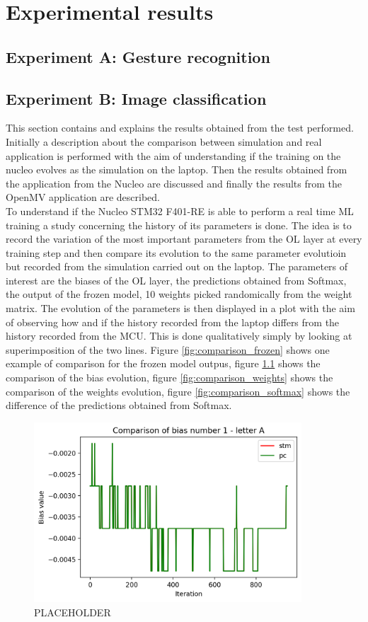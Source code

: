 \documentclass[12pt]{report}
\begin{document}
\chapter{Experimental results} 

\section{Experiment A: Gesture recognition}

\section{Experiment B: Image classification}

This section contains and explains the results obtained from the test performed. Initially a description about the comparison between simulation and real application is performed with the aim of understanding if the training on the nucleo evolves as the simulation on the laptop. Then the results obtained from the application from the Nucleo are discussed and finally the results from the OpenMV application are described.\\
To understand if the Nucleo STM32 F401-RE is able to perform a real time ML training a study concerning the history of its parameters is done. The idea is to record the variation of the most important parameters from the OL layer at every training step and then compare its evolution to the same parameter evolutioin but recorded from the simulation carried out on the laptop. The parameters of interest are the biases of the OL layer, the predictions obtained from Softmax, the output of the frozen model, 10 weights picked randomically from the weight matrix. The evolution of the parameters is then displayed in a plot with the aim of observing how and if the history recorded from the laptop differs from the history recorded from the MCU. This is done qualitatively simply by looking at superimposition of the two lines. Figure \ref{fig:comparison_frozen} shows one example of comparison for the frozen model outpus, figure \ref{fig:comparison_bias} shows the comparison of the bias evolution, figure \ref{fig:comparison_weights} shows the comparison of the weights evolution, figure \ref{fig:comparison_softmax} shows the difference of the predictions obtained from Softmax.
%
\begin{figure}[h!]
    \centering
    \includegraphics[width=100mm]{Figures/Chapter5/bias_example.png} 
    \caption{PLACEHOLDER}
    \label{fig:comparison_bias}    
\end{figure}
\end{document}
